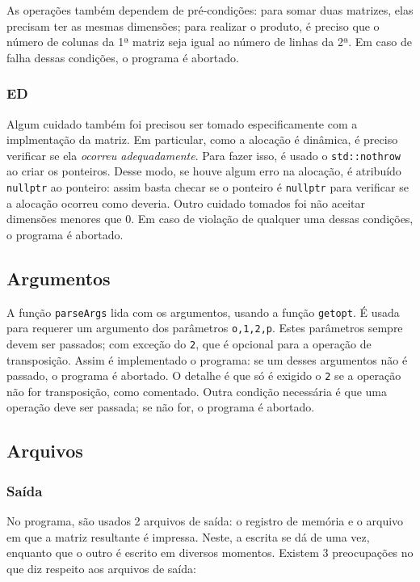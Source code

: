 \documentclass{article}
\def\code#1{\texttt{#1}}
\begin{document}
As operações também dependem de pré-condições: para somar duas matrizes, elas precisam ter as mesmas dimensões; para realizar o produto, é preciso que o número de colunas da 1ª matriz seja igual ao número de linhas da 2ª. Em caso de falha dessas condições, o programa é abortado.

\subsubsection{ED}

Algum cuidado também foi precisou ser tomado especificamente com a implmentação da matriz. Em particular, como a alocação é dinâmica, é preciso verificar se ela \textit{ocorreu adequadamente}. Para fazer isso, é usado o \code{std::nothrow} ao criar os ponteiros. Desse modo, se houve algum erro na alocação, é atribuído \code{nullptr} ao ponteiro: assim basta checar se o ponteiro é \code{nullptr} para verificar se a alocação ocorreu como deveria. Outro cuidado tomados foi não aceitar dimensões menores que 0. Em caso de violação de qualquer uma dessas condições, o programa é abortado. 

\subsection{Argumentos}

A função \code{parseArgs} lida com os argumentos, usando a função \code{getopt}. É usada para requerer um argumento dos parâmetros \code{o,1,2,p}. Estes parâmetros sempre devem ser passados; com exceção do \code{2}, que é opcional para a operação de transposição. Assim é implementado o programa: se um desses argumentos não é passado, o programa é abortado. O detalhe é que só é exigido o \code{2} se a operação não for transposição, como comentado. Outra condição necessária é que uma operação deve ser passada; se não for, o programa é abortado.

\subsection{Arquivos}

\subsubsection{Saída}

No programa, são usados 2 arquivos de saída: o registro de memória e o arquivo em que a matriz resultante é impressa. Neste, a escrita se dá de uma vez, enquanto que o outro é escrito em diversos momentos. Existem 3 preocupações no que diz respeito aos arquivos de saída:
\end{document}
